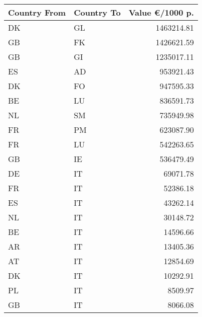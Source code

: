 \begin{tabular}{llr}
\toprule
Country From & Country To & Value €/1000 p. \\
\midrule
          DK &         GL &      1463214.81 \\
          GB &         FK &      1426621.59 \\
          GB &         GI &      1235017.11 \\
          ES &         AD &       953921.43 \\
          DK &         FO &       947595.33 \\
          BE &         LU &       836591.73 \\
          NL &         SM &       735949.98 \\
          FR &         PM &       623087.90 \\
          FR &         LU &       542263.65 \\
          GB &         IE &       536479.49 \\
\midrule
          DE &         IT &        69071.78 \\
          FR &         IT &        52386.18 \\
          ES &         IT &        43262.14 \\
          NL &         IT &        30148.72 \\
          BE &         IT &        14596.66 \\
          AR &         IT &        13405.36 \\
          AT &         IT &        12854.69 \\
          DK &         IT &        10292.91 \\
          PL &         IT &         8509.97 \\
          GB &         IT &         8066.08 \\
\bottomrule
\end{tabular}